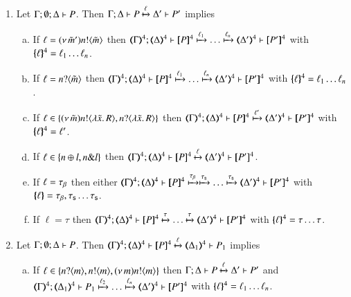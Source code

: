\begin{proposition}\myrm
	\label{app:prop:op_corr_pHOp_to_HOp}
%
	\begin{enumerate}
		\item	Let $\Gamma; \emptyset; \Delta \vdash P$. Then
			$\Gamma; \Delta \vdash P \xmapsto{\ell} \Delta' \vdash P'$ implies
%
			\begin{enumerate}[a)]
				\item	If $\ell = (\nu\, \tilde{m}') n ! \langle \tilde{m} \rangle$ then
					$\horel{\tmap{\Gamma}{4}}{\tmap{\Delta}{4}}{\pmap{P}{4}}{\hby{\ell_1} \dots \hby{\ell_n}}{\tmap{\Delta'}{4}}{\pmap{P'}{4}}$
					with $\{\!\!\{\ell\}\!\!\}^{4} = \ell_1 \dots \ell_n$.

				\item	If $\ell = n ? \langle \tilde{m} \rangle$ then
					$\horel{\tmap{\Gamma}{4}}{\tmap{\Delta}{4}}{\pmap{P}{4}}{\hby{\ell_1} \dots \hby{\ell_n}}{\tmap{\Delta'}{4}}{\pmap{P'}{4}}$
					with $\{\!\!\{\ell\}\!\!\}^{4} = \ell_1 \dots \ell_n$.

				\item	If $\ell \in \{(\nu\, \tilde{m}) n ! \langle \lambda \tilde{x}.\,R \rangle, n ? \langle \lambda \tilde{x}.\,R \rangle\}$ then
					$\horel{\tmap{\Gamma}{4}}{\tmap{\Delta}{4}}{\pmap{P}{4}}{\hby{\ell'}}
					{\tmap{\Delta'}{4}}{\pmap{P'}{4}}$ with $\{\!\!\{\ell\}\!\!\}^{4} = \ell'$.

				\item	If $\ell \in \{n \oplus l, n \& l\}$ then
					$\horel{\tmap{\Gamma}{4}}{\tmap{\Delta}{4}}{\pmap{P}{4}}{\hby{\ell}}
					{\tmap{\Delta'}{4}}{\pmap{P'}{4}}$.

				\item	If $\ell = \tau_{\beta}$ then either
					$\horel{\tmap{\Gamma}{4}}{\tmap{\Delta}{4}}{\pmap{P}{4}}{\hby{\btau} \hby{\stau} \dots \hby{\stau}}
					{\tmap{\Delta'}{4}}{\pmap{P'}{4}}$ with $\{\!\!\{\ell\}\!\!\} = \tau_{\beta}, \tau_{\mathsf{s}} \dots \tau_{\mathsf{s}}$.

				\item	If $\ell = \tau$ then %
					$\horel{\tmap{\Gamma}{4}}{\tmap{\Delta}{4}}{\pmap{P}{4}}{\hby{\tau} \dots \hby{\tau}}
					{\tmap{\Delta'}{4}}{\pmap{P'}{4}}$ with $\{\!\!\{\ell\}\!\!\}^{4} = \tau \dots \tau$.
			\end{enumerate}

		\item	Let $\Gamma; \emptyset; \Delta \vdash P$. Then
			$\horel{\tmap{\Gamma}{4}}{\tmap{\Delta}{4}}{\pmap{P}{4}}{\hby{\ell}}
			{\tmap{\Delta_1}{4}}{P_1}$ implies
%
			\begin{enumerate}[a)]
				\item	If $\ell \in \{n ? \langle m \rangle, n ! \langle m \rangle, (\nu\, m) n ! \langle m \rangle\}$ then
					$\Gamma; \Delta \vdash P \xmapsto{\ell} \Delta' \vdash P'$ and\\
					$\horel{\tmap{\Gamma}{4}}{\tmap{\Delta_1}{4}}{P_1}{\hby{\ell_2} \dots \hby{\ell_n}}
					{\tmap{\Delta'}{4}}{\pmap{P'}{4}}$ with $\{\!\!\{\ell\}\!\!\}^{4} = \ell_1 \dots \ell_n$.


\end{enumerate}
\end{enumerate}
\end{proposition}
